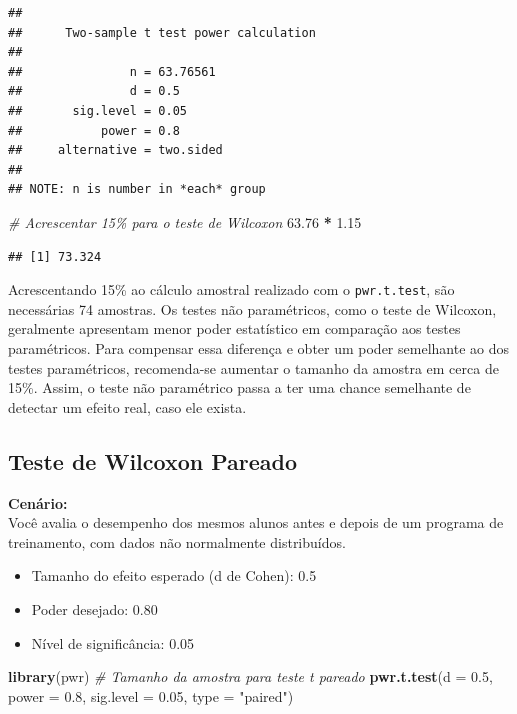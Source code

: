 \documentclass[
]{book}
\newenvironment{Shaded}{\begin{snugshade}}{\end{snugshade}}
\newcommand{\AttributeTok}[1]{\textcolor[rgb]{0.13,0.29,0.53}{#1}}
\newcommand{\CommentTok}[1]{\textcolor[rgb]{0.56,0.35,0.01}{\textit{#1}}}
\newcommand{\FloatTok}[1]{\textcolor[rgb]{0.00,0.00,0.81}{#1}}
\newcommand{\FunctionTok}[1]{\textcolor[rgb]{0.13,0.29,0.53}{\textbf{#1}}}
\newcommand{\NormalTok}[1]{#1}
\newcommand{\SpecialCharTok}[1]{\textcolor[rgb]{0.81,0.36,0.00}{\textbf{#1}}}
\newcommand{\StringTok}[1]{\textcolor[rgb]{0.31,0.60,0.02}{#1}}
\providecommand{\tightlist}{%
  \setlength{\itemsep}{0pt}\setlength{\parskip}{0pt}}
\begin{document}
\begin{verbatim}
## 
##      Two-sample t test power calculation 
## 
##               n = 63.76561
##               d = 0.5
##       sig.level = 0.05
##           power = 0.8
##     alternative = two.sided
## 
## NOTE: n is number in *each* group
\end{verbatim}

\begin{Shaded}
\begin{Highlighting}[]
\CommentTok{\# Acrescentar 15\% para o teste de Wilcoxon}
\FloatTok{63.76} \SpecialCharTok{*} \FloatTok{1.15}
\end{Highlighting}
\end{Shaded}

\begin{verbatim}
## [1] 73.324
\end{verbatim}

Acrescentando 15\% ao cálculo amostral realizado com o \texttt{pwr.t.test}, são necessárias 74 amostras. Os testes não paramétricos, como o teste de Wilcoxon, geralmente apresentam menor poder estatístico em comparação aos testes paramétricos. Para compensar essa diferença e obter um poder semelhante ao dos testes paramétricos, recomenda-se aumentar o tamanho da amostra em cerca de 15\%. Assim, o teste não paramétrico passa a ter uma chance semelhante de detectar um efeito real, caso ele exista.

\subsection{Teste de Wilcoxon Pareado}\label{teste-de-wilcoxon-pareado}

\textbf{Cenário:}\\
Você avalia o desempenho dos mesmos alunos antes e depois de um programa de treinamento, com dados não normalmente distribuídos.

\begin{itemize}
\tightlist
\item
  Tamanho do efeito esperado (d de Cohen): 0.5\\
\item
  Poder desejado: 0.80\\
\item
  Nível de significância: 0.05
\end{itemize}

\begin{Shaded}
\begin{Highlighting}[]
\FunctionTok{library}\NormalTok{(pwr)}
\CommentTok{\# Tamanho da amostra para teste t pareado}
\FunctionTok{pwr.t.test}\NormalTok{(}\AttributeTok{d =} \FloatTok{0.5}\NormalTok{, }\AttributeTok{power =} \FloatTok{0.8}\NormalTok{, }\AttributeTok{sig.level =} \FloatTok{0.05}\NormalTok{, }\AttributeTok{type =} \StringTok{"paired"}\NormalTok{)}
\end{Highlighting}
\end{Shaded}
\end{document}
